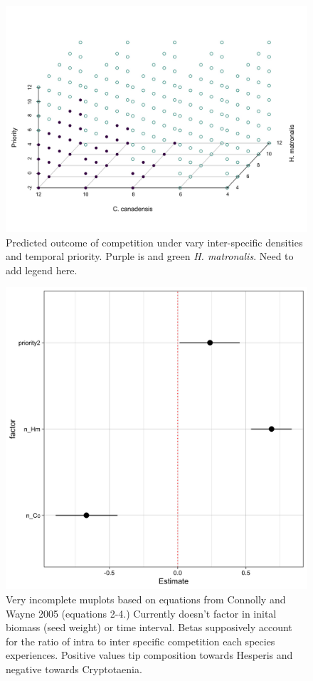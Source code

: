 \documentclass[11pt]{article}\usepackage[]{graphicx}\usepackage[]{color}
\begin{document}
\begin{figure}[h!]
    \centering
\includegraphics[width=\textwidth]{..//figure/threedpred.jpeg}
    \caption{Predicted outcome of competition under vary inter-specific densities and temporal priority. Purple is  and green \textit{H. matronalis}. Need to add legend here. } 
    \label{fig:Hm}
\end{figure}

\begin{figure}[h!]
    \centering
\includegraphics[width=\textwidth]{..//figure/RGRD_muplot.png}
    \caption{Very incomplete muplots based on equations from Connolly and Wayne 2005 (equations 2-4.) Currently doesn't factor in inital biomass (seed weight) or time interval. Betas supposively account for the ratio of intra to inter specific competition each species experiences. Positive values tip composition towards Hesperis and negative towards Cryptotaenia. } 
    \label{fig:Con}
\end{figure}
\end{document}

